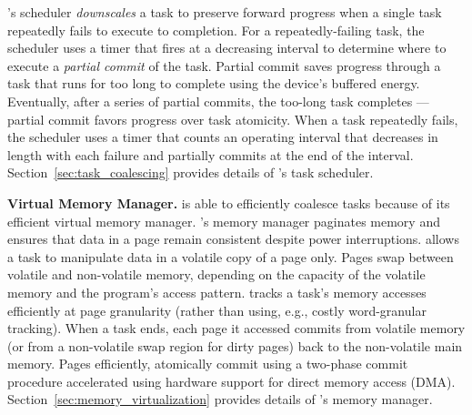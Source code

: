 \sys's scheduler {\em downscales} a task to preserve forward progress when a
single task repeatedly fails to execute to completion.  For a repeatedly-failing
task, the scheduler uses a timer that fires at a decreasing interval to
determine where to execute a {\em partial commit} of the task. Partial
commit saves progress through a task that runs for too long to complete
using the device's buffered energy. Eventually, after a series of partial
commits, the too-long task completes --- partial commit favors progress over task atomicity.  
When a task repeatedly fails, the scheduler uses a timer that counts an operating interval
that decreases in length with each failure and \sys partially commits at the end of the interval. 
Section~\ref{sec:task_coalescing} provides details of \sys's task scheduler.

\textbf{\sys Virtual Memory Manager.} \sys is able to efficiently coalesce
tasks because of its efficient virtual memory manager. \sys's memory manager
paginates memory and ensures that data in a page remain consistent despite
power interruptions. \sys allows a task to manipulate data in a volatile copy
of a page only. Pages swap between volatile and non-volatile memory, depending
on the capacity of the volatile memory and the program's access pattern. \sys
tracks a task's memory accesses efficiently at page granularity (rather than
using, e.g., costly word-granular tracking). When a task ends, each page it
accessed commits from volatile memory (or from a non-volatile swap region for
dirty pages) back to the non-volatile main memory. Pages efficiently,
atomically commit using a two-phase commit procedure accelerated using hardware
support for direct memory access (DMA). Section~\ref{sec:memory_virtualization}
provides details of \sys's memory manager.
